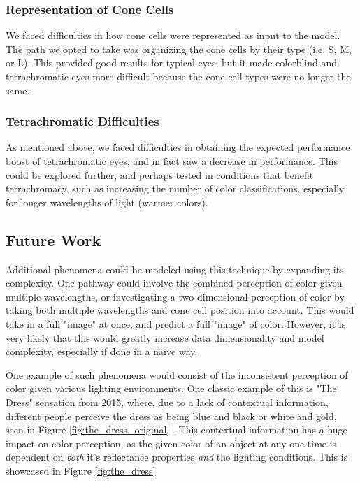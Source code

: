 \documentclass[titlepage]{article}
\begin{document}
\subsubsection{Representation of Cone Cells}

We faced difficulties in how cone cells were represented as input to the model. The path we opted to take was organizing the cone cells by their type (i.e. S, M, or L). This provided good results for typical eyes, but it made colorblind and tetrachromatic eyes more difficult because the cone cell types were no longer the same.

\subsubsection{Tetrachromatic Difficulties}

As mentioned above, we faced difficulties in obtaining the expected performance boost of tetrachromatic eyes, and in fact saw a decrease in performance. This could be explored further, and perhaps tested in conditions that benefit tetrachromacy, such as increasing the number of color classifications, especially for longer wavelengths of light (warmer colors).

\subsection{Future Work}

Additional phenomena could be modeled using this technique by expanding its complexity. One pathway could involve the combined perception of color given multiple wavelengths, or investigating a two-dimensional perception of color by taking both multiple wavelengths and cone cell position into account. This would take in a full "image" at once, and predict a full "image" of color. However, it is very likely that this would greatly increase data dimensionality and model complexity, especially if done in a naive way. 

\bigskip

One example of such phenomena would consist of the inconsistent perception of color given various lighting environments. One classic example of this is "The Dress" sensation from 2015, where, due to a lack of contextual information, different people perceive the dress as being blue and black or white and gold, seen in Figure \ref{fig:the_dress_original} \cite{thedress}. This contextual information has a huge impact on color perception, as the given color of an object at any one time is dependent on \textit{both} it's reflectance properties \textit{and} the lighting conditions. This is showcased in Figure \ref{fig:the_dress}
\end{document}

